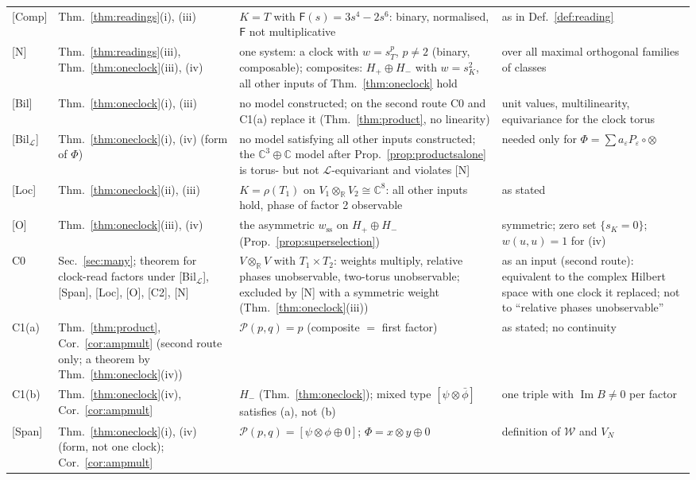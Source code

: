 \documentclass[aps,pra,onecolumn,superscriptaddress,nofootinbib,10pt]{revtex4-2}
\theoremstyle{definition}
\theoremstyle{remark}
\newcommand{\R}{\mathbb{R}}
\newcommand{\C}{\mathbb{C}}
\newcommand{\cL}{\mathcal{L}}
\newcommand{\im}{\operatorname{Im}}
\begin{document}
\begin{table}[h]
\begin{tabular}{@{}p{}p{}p{}p{}@{}}
{[Comp]} & Thm.~\ref{thm:readings}(i), (iii) & $K=T$ with $\mathsf F(s)=3s^4-2s^6$: binary, normalised, $\mathsf F$ not multiplicative & as in Def.~\ref{def:reading}\\
{[N]} & Thm.~\ref{thm:readings}(iii), Thm.~\ref{thm:oneclock}(iii), (iv) & one system: a clock with $w=s_T^p$, $p\ne2$ (binary, composable); composites: $H_+\oplus H_-$ with $w=s_K^2$, all other inputs of Thm.~\ref{thm:oneclock} hold & over all maximal orthogonal families of classes\\
{[Bil]} & Thm.~\ref{thm:oneclock}(i), (iii) & no model constructed; on the second route C0 and C1(a) replace it (Thm.~\ref{thm:product}, no linearity) & unit values, multilinearity, equivariance for the clock torus\\
{[Bil$_\cL$]} & Thm.~\ref{thm:oneclock}(i), (iv) (form of $\Phi$) & no model satisfying all other inputs constructed; the $\C^3\oplus\C$ model after Prop.~\ref{prop:productsalone} is torus- but not $\cL$-equivariant and violates [N] & needed only for $\Phi=\sum a_\varepsilon P_\varepsilon\circ\otimes$\\
{[Loc]} & Thm.~\ref{thm:oneclock}(ii), (iii) & $K=\rho(T_1)$ on $V_1\otimes_\R V_2\cong\C^8$: all other inputs hold, phase of factor 2 observable & as stated\\
{[O]} & Thm.~\ref{thm:oneclock}(iii), (iv) & the asymmetric $w_{\mathrm{ss}}$ on $H_+\oplus H_-$ (Prop.~\ref{prop:superselection}) & symmetric; zero set $\{s_K=0\}$; $w(u,u)=1$ for (iv)\\
C0 & Sec.~\ref{sec:many}; theorem for clock-read factors under [Bil$_\cL$], [Span], [Loc], [O], [C2], [N] & $V\otimes_\R V$ with $T_1\times T_2$: weights multiply, relative phases unobservable, two-torus unobservable; excluded by [N] with a symmetric weight (Thm.~\ref{thm:oneclock}(iii)) & as an input (second route): equivalent to the complex Hilbert space with one clock it replaced; not to ``relative phases unobservable''\\
C1(a) & Thm.~\ref{thm:product}, Cor.~\ref{cor:ampmult} (second route only; a theorem by Thm.~\ref{thm:oneclock}(iv)) & $\mathcal P(p,q)=p$ (composite $=$ first factor) & as stated; no continuity\\
C1(b) & Thm.~\ref{thm:oneclock}(iv), Cor.~\ref{cor:ampmult} & $H_-$ (Thm.~\ref{thm:oneclock}); mixed type $[\psi\otimes\bar\phi]$ satisfies (a), not (b) & one triple with $\im B\ne0$ per factor\\
{[Span]} & Thm.~\ref{thm:oneclock}(i), (iv) (form, not one clock); Cor.~\ref{cor:ampmult} & $\mathcal P(p,q)=[\psi\otimes\phi\oplus0]$; $\Phi=x\otimes y\oplus0$ & definition of $\mathcal W$ and $V_N$\\

\end{tabular}
\end{table}
\end{document}
